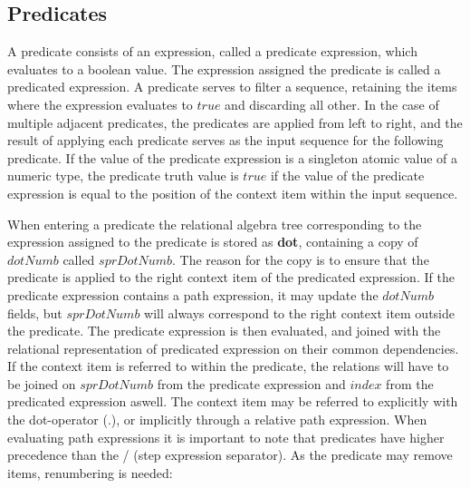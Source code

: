 \subsection{Predicates}
\label{sect:trans:TD:predicates}
A predicate consists of an expression, called a predicate expression, which evaluates to a boolean value. The
expression assigned the predicate is called a predicated expression. A predicate serves to filter a sequence,
retaining the items where the expression evaluates to $true$ and discarding all other. In the case of multiple
adjacent predicates, the predicates are applied from left to right, and the result of applying each predicate
serves as the input sequence for the following predicate. If the value of the predicate expression is a singleton
atomic value of a numeric type, the predicate truth value is $true$ if the value of the predicate expression is
equal to the position of the context item within the input sequence.

When entering a predicate the relational algebra tree corresponding to the expression assigned to the predicate is
stored as \textbf{dot}, containing a copy of $dotNumb$ called $sprDotNumb$. The reason for the copy is to ensure
that the predicate is applied to the right context item of the predicated expression. If the predicate
expression contains a path expression, it may update the $dotNumb$ fields, but $sprDotNumb$ will always correspond
to the right context item outside the predicate. The predicate expression is then evaluated, and joined with
the relational representation of predicated expression on their common dependencies. If the context item is
referred to within the predicate, the relations will have to be joined on $sprDotNumb$ from the predicate
expression and $index$ from the predicated expression aswell. The context item may be referred to explicitly with
the dot-operator (.), or implicitly through a relative path expression. When evaluating path expressions it is
important to note that predicates have higher precedence than the / (step expression separator). As the predicate
may remove items, renumbering is needed:

